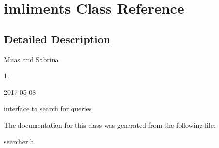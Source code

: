 \hypertarget{classimliments}{}\section{imliments Class Reference}
\label{classimliments}


\subsection{Detailed Description}
Muaz and Sabrina

1.

2017-\/05-\/08

interface to search for queries 

The documentation for this class was generated from the following file\+:\begin{DoxyCompactItemize}
\item 
searcher.\+h\end{DoxyCompactItemize}
